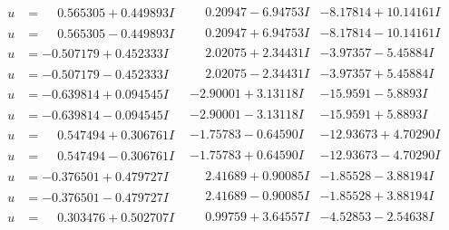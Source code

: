 \documentclass[1p]{elsarticle_modified}
\theoremstyle{definition}
\begin{document}
$$\begin{array}{c|c|c}
\begin{aligned}
u &= \phantom{-}0.565305 + 0.449893 I\end{aligned}
 & \phantom{-}0.20947 - 6.94753 I & -8.17814 + 10.14161 I \\ \hline\begin{aligned}
u &= \phantom{-}0.565305 - 0.449893 I\end{aligned}
 & \phantom{-}0.20947 + 6.94753 I & -8.17814 - 10.14161 I \\ \hline\begin{aligned}
u &= -0.507179 + 0.452333 I\end{aligned}
 & \phantom{-}2.02075 + 2.34431 I & -3.97357 - 5.45884 I \\ \hline\begin{aligned}
u &= -0.507179 - 0.452333 I\end{aligned}
 & \phantom{-}2.02075 - 2.34431 I & -3.97357 + 5.45884 I \\ \hline\begin{aligned}
u &= -0.639814 + 0.094545 I\end{aligned}
 & -2.90001 + 3.13118 I & -15.9591 - 5.8893 I \\ \hline\begin{aligned}
u &= -0.639814 - 0.094545 I\end{aligned}
 & -2.90001 - 3.13118 I & -15.9591 + 5.8893 I \\ \hline\begin{aligned}
u &= \phantom{-}0.547494 + 0.306761 I\end{aligned}
 & -1.75783 - 0.64590 I & -12.93673 + 4.70290 I \\ \hline\begin{aligned}
u &= \phantom{-}0.547494 - 0.306761 I\end{aligned}
 & -1.75783 + 0.64590 I & -12.93673 - 4.70290 I \\ \hline\begin{aligned}
u &= -0.376501 + 0.479727 I\end{aligned}
 & \phantom{-}2.41689 + 0.90085 I & -1.85528 - 3.88194 I \\ \hline\begin{aligned}
u &= -0.376501 - 0.479727 I\end{aligned}
 & \phantom{-}2.41689 - 0.90085 I & -1.85528 + 3.88194 I \\ \hline\begin{aligned}
u &= \phantom{-}0.303476 + 0.502707 I\end{aligned}
 & \phantom{-}0.99759 + 3.64557 I & -4.52853 - 2.54638 I \\ \hline\begin{aligned}

\end{aligned}
\end{array}$$
\end{document}
